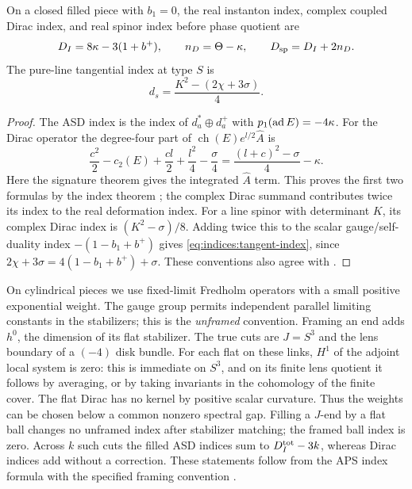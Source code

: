 \begin{lemma}\label{lem:indices:closed}
On a closed filled piece with $b_1=0$, the real instanton index, complex
coupled Dirac index, and real spinor index before phase quotient are
\begin{equation}\label{eq:indices:closed-indices}
 D_I=8\kappa-3(1+b^+),\qquad
 n_D=\Theta-\kappa,\qquad D_{\rm sp}=D_I+2n_D.
\end{equation}
The pure-line tangential index at type $S$ is
\begin{equation}\label{eq:indices:tangent-index}
 d_s=\frac{K^2-(2\chi+3\sigma)}4.
\end{equation}
\end{lemma}
\begin{proof}
The ASD index is the index of $d_a^*\oplus d_a^+$ with
$p_1(\operatorname{ad} E)=-4\kappa$.  For the Dirac operator the degree-four part of
$\operatorname{ch}(E)e^{l/2}\widehat A$ is
\[
 \frac{c^2}{2}-c_2(E)+\frac{cl}{2}+\frac{l^2}{4}
       -\frac{\sigma}{4}
 =\frac{(l+c)^2-\sigma}{4}-\kappa.
\]
Here the signature theorem gives the integrated $\widehat A$ term.
This proves the first two formulas by the index theorem
\cite{AtiyahSingerIII}; the complex Dirac summand contributes twice its
index to the real deformation index.  For a line spinor with determinant
$K$, its complex Dirac index is $(K^2-\sigma)/8$.  Adding twice this to the
scalar gauge/self-duality index $-(1-b_1+b^+)$ gives
\eqref{eq:indices:tangent-index}, since
$2\chi+3\sigma=4(1-b_1+b^+)+\sigma$.
These conventions also agree with
\cite[Equations~(2.51) and~(2.63)]{FeehanLenessLinksI}.
\end{proof}

On cylindrical pieces we use fixed-limit Fredholm operators with a small
positive exponential weight.  The gauge group permits independent parallel
limiting constants in the stabilizers; this is the \emph{unframed}
convention.  Framing an end adds $h^0$, the dimension of its flat
stabilizer.  The true cuts are $J=S^3$ and the lens boundary of a
$(-4)$ disk bundle.  For each flat on these links, $H^1$ of the adjoint local
system is zero: this is immediate on $S^3$, and on its finite lens quotient
it follows by averaging, or by taking invariants in the cohomology of the
finite cover.  The flat Dirac has no kernel by positive scalar curvature.
Thus the weights can be chosen below a common nonzero spectral gap.  Filling
a $J$-end by a flat ball changes no unframed index after stabilizer matching;
the framed ball index is zero.  Across $k$ such cuts the filled ASD indices
sum to $D_I^{\rm tot}-3k$, whereas Dirac indices add without a correction.
These statements follow from the APS index formula with the specified
framing convention \cite{AtiyahPatodiSingerI}.

